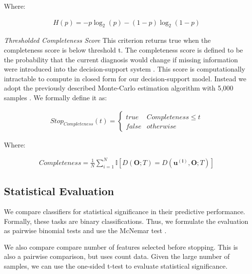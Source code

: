Where:

\begin{align}
H(p) = -p\log_2(p) - (1-p)\log_2(1-p)
\end{align}


\emph{Thresholded Completeness Score}
This criterion returns true when the completeness score is below threshold t. The completeness score is defined to be the probability that the current diagnosis would change if missing information were introduced into the decision-support system \cite{Gimenez:2014tr}. This score is computationally intractable to compute in closed form for our decision-support model. Instead we adopt the previously described Monte-Carlo estimation algorithm with 5,000 samples \cite{Gimenez:2014tr}. We formally define it as:

\begin{align}
Stop_{Completeness}(t) =
\begin{cases} 
true & Completeness \leq t \\
false & otherwise
\end{cases}
\end{align}

Where:

\begin{align}
Completeness = \frac{1}{N}\sum_{i =1 }^{N}\mathbb{I}\left[D(\mathbf{O};T) = D(\mathbf{u^{(i)}},\mathbf{O};T)\right]
\end{align}



\subsection{Statistical Evaluation}
We compare classifiers for statistical significance in their predictive performance. Formally, these tasks are binary classifications. Thus, we formulate the evaluation as pairwise binomial tests and use the McNemar test \cite{Stock:2014tn}.

We also compare compare number of features selected before stopping. This is also a pairwise comparison, but uses count data. Given the large number of samples, we can use the one-sided t-test to evaluate statistical significance.
